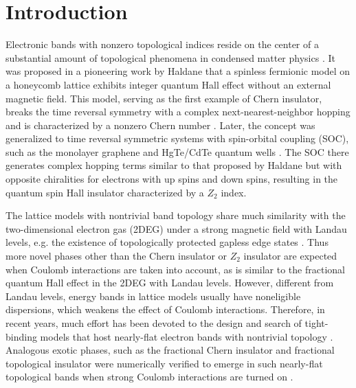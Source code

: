 \documentclass[amsmath,superscriptaddress,showpacs,aps,prb,twocolumn]{revtex4-1}
\begin{document}
\section{Introduction}
\par Electronic bands with nonzero topological indices reside on the center of a substantial amount of topological phenomena in condensed matter physics \cite{HK_RMP2010,QZ_RMP2011}. It was proposed in a pioneering work by Haldane \cite{H_PRL1988} that a spinless fermionic model on a honeycomb lattice exhibits integer quantum Hall effect \cite{KDP_PRL1980} without an external magnetic field. This model, serving as the first example of Chern insulator, breaks the time reversal symmetry with a complex next-nearest-neighbor hopping and is characterized by a nonzero Chern number \cite{TKNN_PRL1982}. Later, the concept was generalized to time reversal symmetric systems with spin-orbital coupling (SOC), such as the monolayer graphene \cite{KM_PRL2005a,KM_PRL2005b} and HgTe/CdTe quantum wells \cite{BHZ_S2006,Ketc_S2007}. The SOC there generates complex hopping terms similar to that proposed by Haldane but with opposite chiralities for electrons with up spins and down spins, resulting in the quantum spin Hall insulator characterized by a $Z_2$ index.

\par The lattice models with nontrivial band topology share much similarity with the two-dimensional electron gas (2DEG) under a strong magnetic field with Landau levels, e.g. the existence of topologically protected gapless edge states \cite{H_PRL1988,L_PRB1981,H_PRB1982,KM_PRL2005a,KM_PRL2005b,BHZ_S2006,Ketc_S2007,YXL_PRL2011,LYGL_PRB2016,LGLW_NJP2017}. Thus more novel phases other than the Chern insulator or $Z_2$ insulator are expected when Coulomb interactions are taken into account, as is similar to the fractional quantum Hall effect \cite{TSG_PRL1982,L_PRL1983} in the 2DEG with Landau levels. However, different from Landau levels, energy bands in lattice models usually have noneligible dispersions, which weakens the effect of Coulomb interactions. Therefore, in recent years, much effort has been devoted to the design and search of tight-binding models that host nearly-flat electron bands with nontrivial topology \cite{TMW_PRL2011,WR_PRB2011,SGKD_PRL2011,WGGS_PRL2011,NSCM_PRL2011,TB_PRB2012,YGSD_PRB2012}. Analogous exotic phases, such as the fractional Chern insulator and fractional topological insulator were numerically verified to emerge in such nearly-flat topological bands when strong Coulomb interactions are turned on \cite{NSCM_PRL2011,SGSS_NC2011,RB_PRX2011,NSRCM_PRB2011,LBFL_PRL2012}.
\end{document}
